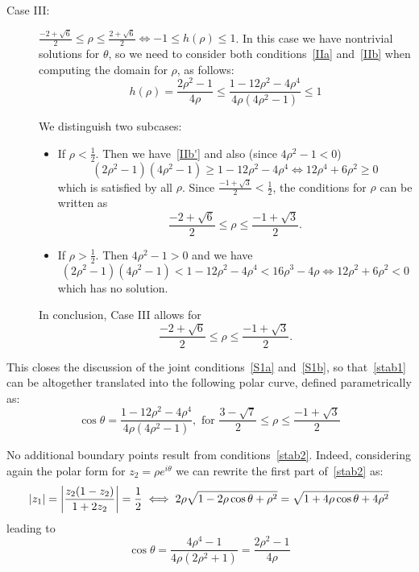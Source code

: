 \documentclass[10pt]{article}
\newcommand{\ds}{\displaystyle}
\begin{document}
\begin{description}
\item[Case III:] $\ds \frac{-2+\sqrt{6}}{2} \leq \rho \leq \frac{2+\sqrt{6}}{2} \iff -1 \leq h(\rho) \leq 1$. In this case we have nontrivial solutions for $\theta$, so we need to consider both conditions~\eqref{IIa} and~\eqref{IIb} when computing the domain for $\rho$, as follows:
\begin{equation*}
h(\rho) = \frac{2\rho^2-1}{4\rho} \leq \frac{1-12\rho^2-4\rho^4}{4\rho(4\rho^2-1)} \leq 1
\end{equation*}

We distinguish two subcases:

\begin{itemize}
\item If $\ds \rho < \frac{1}{2}$. Then we have~\eqref{IIb'} and also (since $4\rho^2-1<0$)
\[
(2\rho^2-1)(4\rho^2-1) \geq 1-12\rho^2-4\rho^4 \iff 12\rho^4+6\rho^2 \geq 0
\]
which is satisfied by all $\rho$. Since $\ds \frac{-1+\sqrt{3}}{2}<\frac{1}{2}$, the conditions for $\rho$ can be written as
\[
\frac{-2+\sqrt{6}}{2} \leq \rho \leq \frac{-1+\sqrt{3}}{2}.
\]

\item If $\ds \rho > \frac{1}{2}$. Then $4\rho^2-1>0$ and we have
\begin{equation*}
(2\rho^2-1)(4\rho^2-1) < 1-12\rho^2-4\rho^4 < 16\rho^3-4\rho \iff 12\rho^2 + 6\rho^2  <0
\end{equation*}
which has no solution.
\end{itemize}

In conclusion, Case III allows for
\[
\frac{-2+\sqrt{6}}{2} \leq \rho \leq \frac{-1+\sqrt{3}}{2}.
\]

\end{description}

This closes the discussion of the joint conditions~\eqref{S1a} and~\eqref{S1b}, so that~\eqref{stab1} can be altogether translated into the following polar curve, defined parametrically as:
\begin{equation}
\cos \theta = \frac{1-12\rho^2-4\rho^4}{4\rho(4\rho^2-1)}, \text{ for } \frac{3-\sqrt{7}}{2} \leq \rho \leq \frac{-1+\sqrt{3}}{2}
\tag{S1$'$} \label{S1'}
\end{equation}

No additional boundary points result from conditions~\eqref{stab2}. Indeed, considering again the polar form for $z_2 = \rho e^{i\theta}$ we can rewrite the first part of~\eqref{stab2} as:
\begin{equation*}
|z_1 | = \left |\frac{z_2(1-z_2)}{1+2z_2}  \right | = \frac{1}{2}\\ \\ \iff 2\rho \sqrt{1-2\rho \cos \theta + \rho^2}  = \sqrt{1+4\rho \cos \theta + 4\rho^2}
\end{equation*}
leading to
\begin{equation}
\cos \theta = \frac{4\rho^4-1}{4\rho (2\rho^2+1)} = \frac{2\rho^2-1}{4\rho}
\tag{S2a} \label{S2a}
\end{equation}
\end{document}
